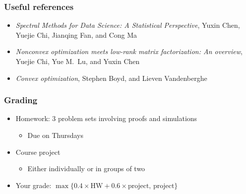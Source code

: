 \documentclass[compress,
mathserif,wide,%
]{beamer}
\begin{document}
\begin{frame}
  \frametitle{Useful references}

\begin{itemize}
  \item {\textit{Spectral Methods for Data Science: A Statistical Perspective}},  Yuxin Chen, Yuejie Chi, Jianqing Fan, and Cong Ma 
\item {\textit{Nonconvex optimization meets low-rank matrix factorization: An overview}},  Yuejie Chi, Yue M.~Lu, and Yuxin Chen 
\item {\textit{Convex optimization}}, Stephen Boyd, and Lieven Vandenberghe

\end{itemize} 
\end{frame}





\begin{frame}
\frametitle{Grading}


\begin{itemize}
\itemsep3em

\item Homework: $3$ problem sets involving proofs and simulations
\smallskip
\begin{itemize}
  \itemsep0.3em
  \item Due on Thursdays
\end{itemize}



\item Course project 
\begin{itemize}
  \item Either individually or in groups of two
\end{itemize}


\item Your grade: $\max\{ 0.4\times \text{HW} + 0.6\times \text{project},\, \text{project} \}$ 

\end{itemize}


\end{frame}
\end{document}
